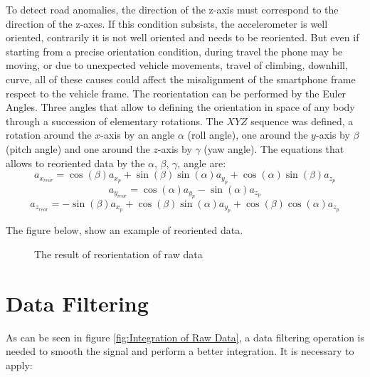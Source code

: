 \documentclass[tesi]{subfiles}
\begin{document}
\vspace{0.25cm}
To detect road anomalies, the direction of the z-axis must correspond to the direction of the z-axes. If this condition subsists, the accelerometer is well oriented, contrarily it is not well oriented and needs to be reoriented. But even if starting from a precise orientation condition, during travel the phone may be moving, or due to unexpected vehicle movements, travel of climbing, downhill, curve, all of these causes could affect the misalignment of the smartphone frame respect to the vehicle frame.
\clearpage
The reorientation can be performed by the Euler Angles. Three angles that allow to defining the orientation in space of any body through a succession of elementary rotations\cite{diebel2006representing}.
The $XYZ$ sequence was defined, a rotation around the $x$-axis by an angle $\alpha$ (roll angle), one around the $y$-axis by $\beta$ (pitch angle) and one around the $z$-axis by  $\gamma$ (yaw angle).
\noindent The equations that allows to reoriented data by the $\alpha$, $\beta$, $\gamma$, angle are:\cite{Andro}
\begin{equation}
a_{x_{reor}} = \cos (\beta) a_{x_{p}} + \sin (\beta) \sin (\alpha) a_{y_{p}} + \cos (\alpha) \sin (\beta) a_{z_{p}} 
\end{equation}
\begin{equation}
a_{y_{reor}} = \cos (\alpha) a_{y_{p}} - \sin (\alpha) a_{z_{p}}
\end{equation}
\begin{equation}
a_{z_{reor}} = -\sin (\beta) a_{x_{p}} + \cos (\beta) \sin (\alpha) a_{y_{p}} + \cos (\beta) \cos (\alpha) a_{z_{p}}
\end{equation}


\noindent The figure below, show an example of reoriented data.
\begin{figure}[H]
  \centering
  

 
  \caption{The result of reorientation of raw data}
  \label{fig:Accelerometer Reoriented}
\end{figure}

\section{Data Filtering} \label{sc:Data Filtering}
As can be seen in figure \ref{fig:Integration of Raw Data}, a data filtering operation is needed to smooth the signal and perform a better integration.
It is necessary to apply:
\end{document}

